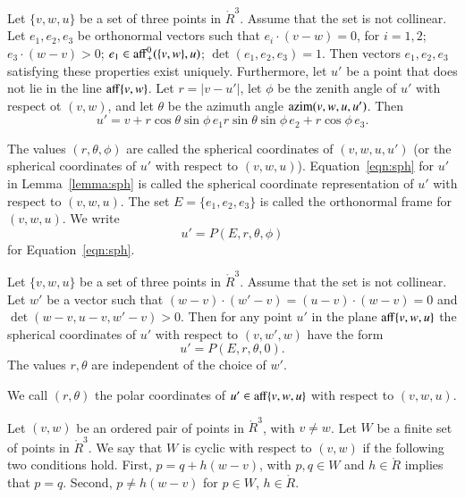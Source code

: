 \begin{lemma}\label{lemma:sph}
Let $\{v,w,u\}$ be a set of three points in $\ring{R}^3$.
Assume that the set is not collinear.  
Let $e_1,e_2,e_3$ be orthonormal vectors such that $e_i \cdot (v-w)=0$, for $i=1,2$;
$e_3\cdot (w-v)>0$; $e_1\in{\operatorname{aff}}_+^0(\{v,w\},u)$; $\det(e_1,e_2,e_3)=1$.
Then vectors $e_1,e_2,e_3$ satisfying these properties exist uniquely.
Furthermore, let $u'$ be a point that does not
lie in the line ${\operatorname{aff}}\{v,w\}$.
Let $r = |v - u'|$, let
$\phi$ be the zenith angle of $u'$ with respect ot $(v,w)$, and let
$\theta$ be the azimuth angle ${\operatorname{azim}}(v,w,u,u')$.  Then
   \begin{equation}
   u' = v + r \cos\theta \sin\phi\, e_1 r \sin\theta\sin\phi\, e_2 +
   r\cos\phi\,e_3.
   \label{eqn:sph}
   \end{equation}
\end{lemma}

\begin{definition}\label{def:sph}
The values $(r,\theta,\phi)$ are called the spherical coordinates of $(v,w,u,u')$
(or the spherical coordinates of $u'$ with respect to $(v,w,u)$).  Equation~\ref{eqn:sph} for
$u'$ in Lemma~\ref{lemma:sph} is called the spherical coordinate representation of
$u'$ with respect to $(v,w,u)$.  The set $E=\{e_1,e_2,e_3\}$ is called
the orthonormal frame for $(v,w,u)$.  We write 
  $$u' = P(E,r,\theta,\phi)$$
for Equation~\ref{eqn:sph}.
\end{definition}

\begin{lemma}\label{lemma:polar-gen}
Let $\{v,w,u\}$ be a set of three points in $\ring{R}^3$.
Assume that the set is not collinear.
Let $w'$ be a vector such that $(w-v)\cdot (w'-v) = (u-v)\cdot (w-v) = 0$ and
$\det(w-v,u-v,w'-v)>0$.
Then for any point $u'$ in the plane ${\operatorname{aff}}\{v,w,u\}$ the spherical coordinates
of $u'$ with respect to $(v,w',w)$ have the form
  $$u' = P(E,r,\theta,0).$$
The values $r,\theta$ are independent of the choice of $w'$. 
\end{lemma}

\begin{definition}\label{def:polar}
We call  $(r,\theta)$ the polar coordinates of $u'\in{\operatorname{aff}}\{v,w,u\}$ with
respect to $(v,w,u)$.
\end{definition}

\begin{definition} Let $(v,w)$ be an ordered pair of points in
$\ring{R}^3$, with $v\ne w$.
Let $W$ be a finite set of points in $\ring{R}^3$.
We say that $W$ is cyclic with respect to $(v,w)$ if
the following two conditions hold.
First, $p = q + h (w-v)$, with $p,q\in W$ and $h\in \ring{R}$
implies that $p=q$.  Second, 
  $p\ne h(w-v)$ for $p\in W$, $h\in\ring{R}$.
\end{definition}

